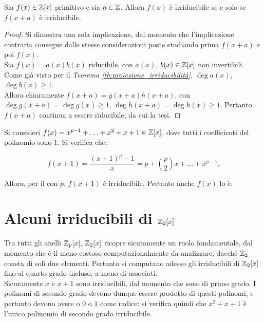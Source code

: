 \documentclass[11pt]{scrbook}
\begin{document}
\begin{theorem}
    Sia $f(x) \in \mathbb{Z}[x]$ primitivo e sia $a \in \mathbb Z$. Allora $f(x)$ è
    irriducibile se e solo se $f(x+a)$ è irriducibile.
\end{theorem}

\begin{proof}
    Si dimostra una sola implicazione, dal momento che l'implicazione
    contraria consegue dalle stesse considerazioni poste
    studiando prima $f(x+a)$ e poi $f(x)$. \\

    Sia $f(x)=a(x)b(x)$ riducibile, con $a(x)$, $b(x) \in \mathbb{Z}[x]$ non
    invertibili. Come già visto per il \textit{Teorema
        \ref{th:proiezione_irriducibilità}}, $\deg a(x)$, $\deg b(x) \geq 1$. \\

    Allora chiaramente $f(x+a)=g(x+a)h(x+a)$, con $\deg g(x+a) =
        \deg g(x) \geq 1$, $\deg h(x+a) = \deg h(x) \geq 1$. Pertanto
    $f(x+a)$ continua a essere riducibile, da cui la tesi.
\end{proof}

\begin{example}
    Si consideri $f(x) = x^{p-1}+\ldots+x^2+x+1 \in \mathbb{Z}[x]$, dove
    tutti i coefficienti del polinomio sono $1$. Si verifica che:

    \[ f(x+1)=\frac{(x+1)^p-1}x = p+\binom{p}{2}x+\ldots+x^{p-1}. \]

    Allora, per il  con $p$, $f(x+1)$ è
    irriducibile. Pertanto anche $f(x)$ lo è.
\end{example}

\section{Alcuni irriducibili di \texorpdfstring{$\mathbb Z_2[x]$}{Z\_2[x]}}

Tra tutti gli anelli $\mathbb{Z}_p[x]$, $\mathbb Z_2[x]$ ricopre sicuramente
un ruolo fondamentale, dal momento che è il meno costoso
computazionalmente da analizzare, dacché $\mathbb Z_2$ consta
di soli due elementi. Pertanto si computano adesso gli
irriducibili di $\mathbb Z_2[x]$ fino al quarto grado incluso, a meno
di associati. \\

Sicuramente $x$ e $x+1$ sono irriducibili, dal momento che sono di
primo grado. I polinomi di secondo grado devono dunque essere
prodotto di questi polinomi, e pertanto devono avere o $0$ o
$1$ come radice: si verifica quindi che $x^2+x+1$ è l'unico
polinomio di secondo grado irriducibile. \\
\end{document}

